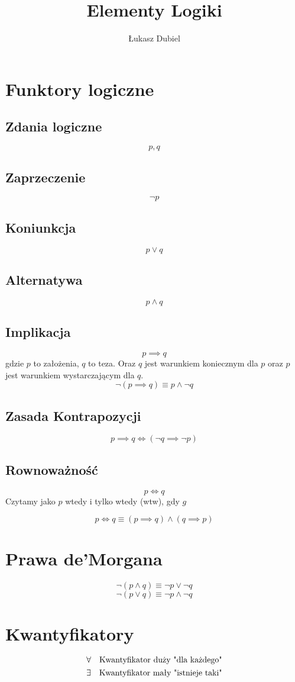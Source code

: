 \documentclass[11pt]{article}
\author{Łukasz Dubiel}
\title{Elementy Logiki}
\begin{document}
\maketitle

\section{Funktory logiczne}
\subsection{Zdania logiczne}
$$p,q$$
\subsection{Zaprzeczenie}
$$ \neg p $$
\subsection{Koniunkcja}
$$ p \vee q $$
\subsection{Alternatywa}
$$ p \wedge q$$
\subsection{Implikacja}
$$ p \implies q $$
gdzie $p$ to założenia, $q$ to teza. Oraz $q$ jest warunkiem koniecznym dla $p$ oraz $p$ jest warunkiem wystarczającym dla $q$.
$$ \neg(p \implies q) \equiv p \wedge \neg q$$
\subsection{Zasada Kontrapozycji}
$$ p \implies q \iff (\neg q \implies \neg p )$$
\subsection{Rownoważność}
$$ p \iff q$$
Czytamy jako $p$ wtedy i tylko wtedy (wtw), gdy $g$

$$ p \iff q \equiv (p \implies q) \wedge (q \implies p)$$
\section{Prawa de'Morgana}
$$\neg(p \wedge q) \equiv \neg p \vee \neg q$$
$$\neg(p \vee q) \equiv \neg p \wedge \neg q$$
\section{Kwantyfikatory}
$$ \forall \quad \hbox{Kwantyfikator duży "dla każdego"} $$
$$ \exists \quad \hbox{Kwantyfikator mały "istnieje taki"}$$
\end{document}
